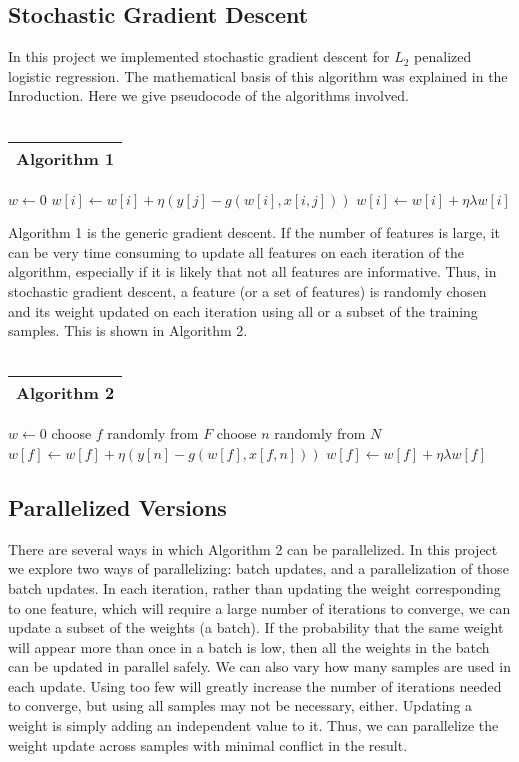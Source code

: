 \documentclass{article}
\begin{document}
\subsection{Stochastic Gradient Descent}
In this project we implemented stochastic gradient descent for $L_2$ penalized logistic regression. The mathematical basis of this algorithm was explained in the Inroduction. Here we give pseudocode of the algorithms involved.
\\
\\
\begin{tabular} {l}
\hline
\hline
Algorithm 1 \\
\hline
\end{tabular}
\begin{algorithmic}
\STATE $w \leftarrow 0$ 
\STATE $w[i] \leftarrow w[i] + \eta(y[j] - g(w[i], x[i, j]))$ 
\ENDFOR 
\STATE $w[i] \leftarrow w[i] + \eta\lambda w[i]$ 
\ENDFOR 
\ENDWHILE 
\end{algorithmic}
Algorithm 1 is the generic gradient descent. If the number of features is large, it can be very time consuming to update all features on each iteration of the algorithm, especially if it is likely that not all features are informative.  Thus, in stochastic gradient descent, a feature (or a set of features) is randomly chosen and its weight updated on each iteration using all or a subset of the training samples. This is shown in Algorithm 2.
\\
\\
\begin{tabular}{l}
\hline
\hline
Algorithm 2 \\
\hline
\end{tabular}
\begin{algorithmic}
\STATE $w \leftarrow 0$
\STATE choose $f$ randomly from $F$
\STATE choose $n$ randomly from $N$
\STATE $w[f] \leftarrow w[f] + \eta(y[n] - g(w[f], x[f, n]))$
\ENDFOR
\STATE $w[f] \leftarrow w[f] + \eta\lambda w[f]$
\ENDFOR
\ENDFOR
\end{algorithmic}
\subsection{Parallelized Versions}
There are several ways in which Algorithm 2 can be parallelized. In this project we explore two ways of parallelizing: batch updates, and a parallelization of those batch updates.  In each iteration, rather than updating the weight corresponding to one feature, which will require a large number of iterations to converge, we can update a subset of the weights (a batch).  If the probability that the same weight will appear more than once in a batch is low, then all the weights in the batch can be updated in parallel safely. We can also vary how many samples are used in each update.  Using too few will greatly increase the number of iterations needed to converge, but using all samples may not be necessary, either.  Updating a weight is simply adding an independent value to it.  Thus, we can parallelize the weight update across samples with minimal conflict in the result.
\end{document}
